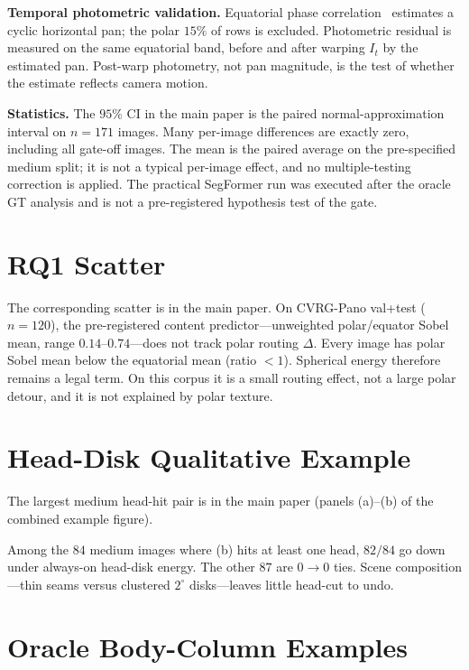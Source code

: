 \documentclass[conference,a4paper]{IEEEtran}
\begin{document}
\textbf{Temporal photometric validation.}
Equatorial phase correlation~\cite{reddy1996fft} estimates a
cyclic horizontal pan; the polar $15\%$ of rows is excluded.
Photometric residual is measured on the same equatorial band,
before and after warping $I_t$ by the estimated pan. Post-warp
photometry, not pan magnitude, is the test of whether the
estimate reflects camera motion.

\textbf{Statistics.}
The $95\%$ CI in the main paper is the paired
normal-approximation interval on $n=171$ images. Many per-image
differences are exactly zero, including all gate-off images. The
mean is the paired average on the pre-specified medium split; it
is not a typical per-image effect, and no multiple-testing
correction is applied. The practical SegFormer run was executed
after the oracle GT analysis and is not a pre-registered
hypothesis test of the gate.

\section{RQ1 Scatter}
\label{sec:supp-c1}

The corresponding scatter is in the main paper. On CVRG-Pano
val+test ($n=120$), the pre-registered content
predictor---unweighted polar/equator Sobel mean, range
$0.14$--$0.74$---does not track polar routing $\Delta$. Every
image has polar Sobel mean below the equatorial mean
(ratio $<1$). Spherical energy therefore remains a legal term.
On this corpus it is a small routing effect, not a large polar
detour, and it is not explained by polar texture.

\section{Head-Disk Qualitative Example}
\label{sec:supp-head}

The largest medium head-hit pair is in the main paper
(panels (a)--(b) of the combined example figure).

Among the $84$ medium images where (b) hits at least one head,
$82/84$ go down under always-on head-disk energy. The other $87$
are $0\to 0$ ties. Scene composition---thin seams versus clustered
$2^\circ$ disks---leaves little head-cut to undo.

\section{Oracle Body-Column Examples}
\label{sec:supp-body}
\end{document}
